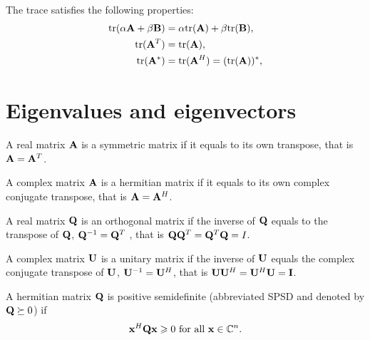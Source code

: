 \begin{proposition}{}{}
    The trace satisfies the following properties:
    \begin{align*}
        \text{tr}(\alpha \bold{A}+\beta \bold{B}) &= \alpha \text{tr}(\bold{A}) + \beta \text{tr}(\bold{B}),\\
        \text{tr}(\bold{A}^T)&=\text{tr}(\bold{A}),\\
        \text{tr}(\bold{A}^*)&=\text{tr}(\bold{A}^H)=(\text{tr}(\bold{A}))^*,\\
    \end{align*}
\end{proposition}


\section{Eigenvalues and eigenvectors}
\begin{definition}{}{}
    A real matrix $\bold{A}$ is a symmetric matrix 
    if it equals to its own transpose, 
    that is $\bold{A} = \bold{A}^T$.
\end{definition}

\begin{definition}{}{}
    A complex matrix $\bold{A}$ is a hermitian matrix 
    if it equals to its own complex conjugate transpose, 
    that is $\bold{A} = \bold{A}^H$.
\end{definition}

\begin{definition}{}{}
    A real matrix $\bold{Q}$ is an orthogonal matrix 
    if the inverse of $\bold{Q}$ equals to 
    the transpose of $\bold{Q}$, $\bold{Q}^{-1} = \bold{Q}^T$
    , that is $\bold{Q}\bold{Q}^T = \bold{Q}^T\bold{Q} = I$.
\end{definition}

\begin{definition}{}{}
    A complex matrix $\bold{U}$ is a unitary matrix 
    if the inverse of $\bold{U}$ equals the complex conjugate
    transpose of $\bold{U}$, $\bold{U}^{-1} = \bold{U}^H$, 
    that is $\bold{U}\bold{U}^H = \bold{U}^H\bold{U} = \bold{I}$.
\end{definition}

\begin{definition}{}{}
    A hermitian matrix $\bold{Q}$ is positive semidefinite (abbreviated SPSD and denoted by $\bold{Q}\succeq 0$) if 
    \begin{align*}
        \bold{x}^H\bold{Q}\bold{x}\geqslant 0 \text{ for all } \bold{x}\in \mathbb{C}^n.
    \end{align*}
\end{definition}

